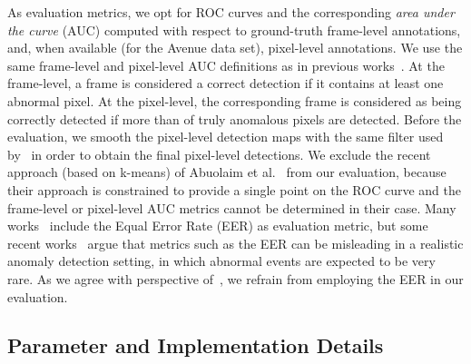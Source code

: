 \documentclass[10pt,twocolumn,letterpaper]{article}
\begin{document}
As evaluation metrics, we opt for ROC curves and the corresponding \emph{area under the curve} (AUC) computed with respect to ground-truth frame-level annotations, and, when available (for the Avenue data set), pixel-level annotations. We use the same frame-level and pixel-level AUC definitions as in previous works~\cite{Cong-CVPR-2011,Giorno-ECCV-2016,Ionescu-ICCV-2017,Lu-ICCV-2013,Mahadevan-CVPR-2010,Sun-PR-2017,Xu-BMVC-2015}. At the frame-level, a frame is considered a correct detection if it contains at least one abnormal pixel. At the pixel-level, the corresponding frame is considered as being correctly detected if more than  of truly anomalous pixels are detected. Before the evaluation, we smooth the pixel-level detection maps with the same filter used by~\cite{Giorno-ECCV-2016,Ionescu-ICCV-2017,Lu-ICCV-2013} in order to obtain the final pixel-level detections. We exclude the recent approach (based on k-means) of Abuolaim et al.~\cite{Abuolaim-CAIP-2017} from our evaluation, because their approach is constrained to provide a single point on the ROC curve and the frame-level or pixel-level AUC metrics cannot be determined in their case. Many works~\cite{Cong-CVPR-2011,Dutta-AAAI-2015,Lu-ICCV-2013,Mahadevan-CVPR-2010,Xu-BMVC-2015,Zhang-PR-2016} include the Equal Error Rate (EER) as evaluation metric, but some recent works~\cite{Giorno-ECCV-2016,Ionescu-ICCV-2017} argue that metrics such as the EER can be misleading in a realistic anomaly detection setting, in which abnormal events are expected to be very rare. As we agree with perspective of~\cite{Giorno-ECCV-2016,Ionescu-ICCV-2017}, we refrain from employing the EER in our evaluation.

\vspace*{-0.1cm}
\subsection{Parameter and Implementation Details}
\vspace*{-0.1cm}
\end{document}
